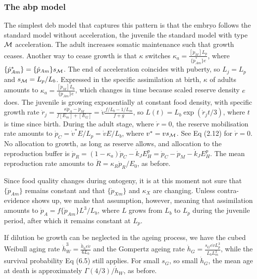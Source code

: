 \subsubsection*{The abp model} 

The simplest {\sc deb} model that captures this pattern is that the embryo follows the standard model without acceleration, the juvenile the standard model with type $\cal M$ acceleration.
The adult increases somatic maintenance such that growth ceases. 
Another way to cease growth is that $\kappa$ switches $\kappa_a = \frac{[\dot{p}_M] L_p} {\{\dot{p}_{Am}^*\} e}$, where $\{\dot{p}_{Am}^*\} = \{\dot{p}_{Am}\} s_{\cal M}$. 
The end of acceleration coincides with puberty, so $L_j = L_p$ and $s_{\cal M} = L_p/ L_b$.
Expressed in the specific assimilation at birth, $\kappa$ of adults amounts to $\kappa_a = \frac{[\dot{p}_M] L_b} {\{\dot{p}_{Am}\} e}$, which changes in time because scaled reserve density $e$ does.
The juvenile is growing exponentially at constant food density, with specific growth rate $\dot{r}_j = \frac{\kappa \dot{p}_A - \dot{p}_M} {f [E_m] + [E_G]} = \dot{v} \frac{f/ L_b - 1/ L_m}{f + g}$, so $L(t) = L_b \exp(\dot{r}_j t/3)$, where $t$ is time since birth. 
During the adult stage, where $\dot{r} = 0$, the reserve mobilisation rate amounts to $\dot{p}_C = \dot{v}^* E/ L_p = \dot{v} E/ L_b$, where $v^* = v s_{\cal M}$.
See Eq (2.12) for $\dot{r} = 0$. 
No allocation to growth, as long as reserve allows, and allocation to the reproduction buffer is $\dot{p}_R = (1 - \kappa_a) \dot{p}_C - \dot{k}_J E_H^p = \dot{p}_C - \dot{p}_M - \dot{k}_J E_H^p$.
The mean reproduction rate amounts to $\dot{R} = \kappa_R \dot{p}_R/ E_0$, as before.

Since food quality changes during ontogeny, it is at this moment not sure that $\{\dot{p}_{Am}\}$ remains constant and that $\{\dot{p}_{Xm}\}$ and $\kappa_X$ are changing.
Unless contra-evidence shows up, we make that assumption, however, meaning that assimilation amounts to $\dot{p}_A = f \{\dot{p}_{Am}\} L^3/ L_b$, where $L$ grows from $L_b$ to $L_p$ during the juvenile period, after which it remains constant at $L_p$.

If dilution be growth can be neglected in the ageing process, we have the cubed Weibull aging rate $\dot{h}_W^3 = \frac{\ddot{h}_a e \dot{v}} {6 L_b}$ and the Gompertz ageing rate $\dot{h}_G = \frac{s_G e \dot{v} L_p^3} {L_b L_m^3}$, while the survival probability Eq (6.5) still applies.
For small $s_G$, so small $\dot{h}_G$, the mean age at death is approximately $\Gamma(4/3)/ \dot{h}_W$, as before.


